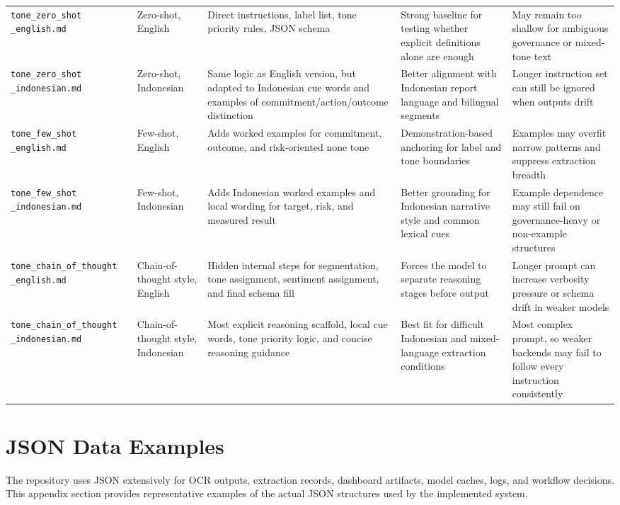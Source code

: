 \documentclass[english, online, cse, master]{dithesis}
\begin{document}
\begin{landscape}
\begin{table}[p]
\begin{tabularx}{\linewidth}{|X|p{2.5cm}|X|X|X|}
\texttt{tone\_zero\_shot
\_english.md} & Zero-shot, English & Direct instructions, label list, tone priority rules, JSON schema & Strong baseline for testing whether explicit definitions alone are enough & May remain too shallow for ambiguous governance or mixed-tone text \\
\texttt{tone\_zero\_shot
\_indonesian.md} & Zero-shot, Indonesian & Same logic as English version, but adapted to Indonesian cue words and examples of commitment/action/outcome distinction & Better alignment with Indonesian report language and bilingual segments & Longer instruction set can still be ignored when outputs drift \\
\texttt{tone\_few\_shot
\_english.md} & Few-shot, English & Adds worked examples for commitment, outcome, and risk-oriented none tone & Demonstration-based anchoring for label and tone boundaries & Examples may overfit narrow patterns and suppress extraction breadth \\
\texttt{tone\_few\_shot
\_indonesian.md} & Few-shot, Indonesian & Adds Indonesian worked examples and local wording for target, risk, and measured result & Better grounding for Indonesian narrative style and common lexical cues & Example dependence may still fail on governance-heavy or non-example structures \\
\texttt{tone\_chain\_of\_thought
\_english.md} & Chain-of-thought style, English & Hidden internal steps for segmentation, tone assignment, sentiment assignment, and final schema fill & Forces the model to separate reasoning stages before output & Longer prompt can increase verbosity pressure or schema drift in weaker models \\
\texttt{tone\_chain\_of\_thought
\_indonesian.md} & Chain-of-thought style, Indonesian & Most explicit reasoning scaffold, local cue words, tone priority logic, and concise reasoning guidance & Best fit for difficult Indonesian and mixed-language extraction conditions & Most complex prompt, so weaker backends may fail to follow every instruction consistently \\
\end{tabularx}
\end{table}
\end{landscape}


\section{JSON Data Examples}\label{json-data-examples}

The repository uses JSON extensively for OCR outputs, extraction records, dashboard artifacts, model caches, logs, and workflow decisions. This appendix section provides representative examples of the actual JSON structures used by the implemented system.
\end{document}
